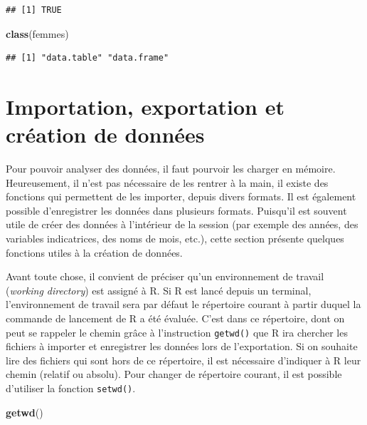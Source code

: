 \documentclass[
  11pt,
]{book}
\newenvironment{Shaded}{\begin{snugshade}}{\end{snugshade}}
\newcommand{\KeywordTok}[1]{\textcolor[rgb]{0.13,0.29,0.53}{\textbf{#1}}}
\newcommand{\NormalTok}[1]{#1}
\numberwithin{equation}{section}
\numberwithin{countremarque}{section}
\begin{document}
\begin{lstlisting}
## [1] TRUE
\end{lstlisting}

\begin{Shaded}
\begin{Highlighting}[]
\KeywordTok{class}\NormalTok{(femmes)}
\end{Highlighting}
\end{Shaded}

\begin{lstlisting}
## [1] "data.table" "data.frame"
\end{lstlisting}

\hypertarget{importation-exportation-et-cruxe9ation-de-donnuxe9es}{%
\section{Importation, exportation et création de données}\label{importation-exportation-et-cruxe9ation-de-donnuxe9es}}

Pour pouvoir analyser des données, il faut pourvoir les charger en mémoire. Heureusement, il n'est pas nécessaire de les rentrer à la main, il existe des fonctions qui permettent de les importer, depuis divers formats. Il est également possible d'enregistrer les données dans plusieurs formats. Puisqu'il est souvent utile de créer des données à l'intérieur de la session (par exemple des années, des variables indicatrices, des noms de mois, etc.), cette section présente quelques fonctions utiles à la création de données.

Avant toute chose, il convient de préciser qu'un environnement de travail (\emph{working directory}) est assigné à R. Si R est lancé depuis un terminal, l'environnement de travail sera par défaut le répertoire courant à partir duquel la commande de lancement de R a été évaluée. C'est dans ce répertoire, dont on peut se rappeler le chemin grâce à l'instruction \texttt{getwd()} que R ira chercher les fichiers à importer et enregistrer les données lors de l'exportation. Si on souhaite lire des fichiers qui sont hors de ce répertoire, il est nécessaire d'indiquer à R leur chemin (relatif ou absolu). Pour changer de répertoire courant, il est possible d'utiliser la fonction \texttt{setwd()}.

\begin{Shaded}
\begin{Highlighting}[]
\KeywordTok{getwd}\NormalTok{()}
\end{Highlighting}
\end{Shaded}
\end{document}
